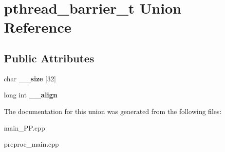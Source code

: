 \hypertarget{unionpthread__barrier__t}{\section{pthread\+\_\+barrier\+\_\+t Union Reference}
\label{unionpthread__barrier__t}
}
\subsection*{Public Attributes}
\begin{DoxyCompactItemize}
\item 
\hypertarget{unionpthread__barrier__t_a3e8f7bbf281a52c6bae79ef5f76266f3}{char {\bfseries \+\_\+\+\_\+size} \mbox{[}32\mbox{]}}\label{unionpthread__barrier__t_a3e8f7bbf281a52c6bae79ef5f76266f3}

\item 
\hypertarget{unionpthread__barrier__t_ae0c9b4ddfcd303427ba687ec2029e859}{long int {\bfseries \+\_\+\+\_\+align}}\label{unionpthread__barrier__t_ae0c9b4ddfcd303427ba687ec2029e859}

\end{DoxyCompactItemize}


The documentation for this union was generated from the following files\+:\begin{DoxyCompactItemize}
\item 
main\+\_\+\+P\+P.\+cpp\item 
preproc\+\_\+main.\+cpp\end{DoxyCompactItemize}
